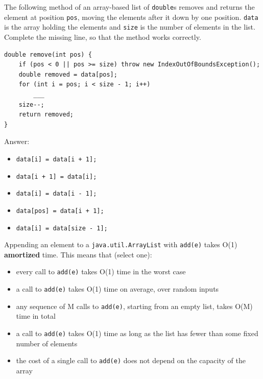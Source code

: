 \begin{question}
The following method of an array-based list of \lstinline|double|s removes and returns the element at position \lstinline|pos|, moving the elements after it down by one position.
\lstinline|data| is the array holding the elements and \lstinline|size| is the number of elements in the list.
Complete the missing line, so that the method works correctly.

\begin{lstlisting}
double remove(int pos) {
    if (pos < 0 || pos >= size) throw new IndexOutOfBoundsException();
    double removed = data[pos];
    for (int i = pos; i < size - 1; i++)
        ___
    size--;
    return removed;
}
\end{lstlisting}

Answer:
\begin{itemize}[leftmargin=2em,itemsep=1pt,topsep=2pt]
\item[\cb{1}] \lstinline|data[i] = data[i + 1];|
\item[\cb{0}] \lstinline|data[i + 1] = data[i];|
\item[\cb{0}] \lstinline|data[i] = data[i - 1];|
\item[\cb{0}] \lstinline|data[pos] = data[i + 1];|
\item[\cb{0}] \lstinline|data[i] = data[size - 1];|
\end{itemize}
\end{question}

\begin{question}
Appending an element to a \lstinline|java.util.ArrayList| with \lstinline|add(e)| takes O(1) \textbf{amortized} time. This means that (select one):
\begin{itemize}[leftmargin=2em,itemsep=1pt,topsep=2pt]
\item[\cb{0}] every call to \lstinline|add(e)| takes O(1) time in the worst case
\item[\cb{0}] a call to \lstinline|add(e)| takes O(1) time on average, over random inputs
\item[\cb{1}] any sequence of M calls to \lstinline|add(e)|, starting from an empty list, takes O(M) time in total
\item[\cb{0}] a call to \lstinline|add(e)| takes O(1) time as long as the list has fewer than some fixed number of elements
\item[\cb{0}] the cost of a single call to \lstinline|add(e)| does not depend on the capacity of the array
\end{itemize}
\end{question}

